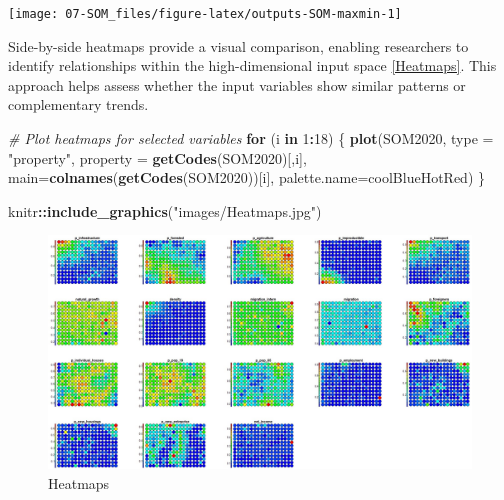 \documentclass[
]{article}
\newenvironment{Shaded}{\begin{snugshade}}{\end{snugshade}}
\newcommand{\AttributeTok}[1]{\textcolor[rgb]{0.13,0.29,0.53}{#1}}
\newcommand{\CommentTok}[1]{\textcolor[rgb]{0.56,0.35,0.01}{\textit{#1}}}
\newcommand{\ControlFlowTok}[1]{\textcolor[rgb]{0.13,0.29,0.53}{\textbf{#1}}}
\newcommand{\DecValTok}[1]{\textcolor[rgb]{0.00,0.00,0.81}{#1}}
\newcommand{\FunctionTok}[1]{\textcolor[rgb]{0.13,0.29,0.53}{\textbf{#1}}}
\newcommand{\NormalTok}[1]{#1}
\newcommand{\SpecialCharTok}[1]{\textcolor[rgb]{0.81,0.36,0.00}{\textbf{#1}}}
\newcommand{\StringTok}[1]{\textcolor[rgb]{0.31,0.60,0.02}{#1}}
\begin{document}
\begin{center}\texttt{[image: 07-SOM\_files/figure-latex/outputs-SOM-maxmin-1]} \end{center}

Side-by-side heatmaps provide a visual comparison, enabling researchers to identify relationships within the high-dimensional input space \autoref{Heatmaps}.
This approach helps assess whether the input variables show similar patterns or complementary trends.

\begin{Shaded}
\begin{Highlighting}[]
\CommentTok{\# Plot heatmaps for selected variables}
\ControlFlowTok{for}\NormalTok{ (i }\ControlFlowTok{in} \DecValTok{1}\SpecialCharTok{:}\DecValTok{18}\NormalTok{) }
\NormalTok{  \{}
\FunctionTok{plot}\NormalTok{(SOM2020, }\AttributeTok{type =} \StringTok{"property"}\NormalTok{, }\AttributeTok{property =} \FunctionTok{getCodes}\NormalTok{(SOM2020)[,i],}
     \AttributeTok{main=}\FunctionTok{colnames}\NormalTok{(}\FunctionTok{getCodes}\NormalTok{(SOM2020))[i], }\AttributeTok{palette.name=}\NormalTok{coolBlueHotRed)}
\NormalTok{  \}}
\end{Highlighting}
\end{Shaded}

\begin{Shaded}
\begin{Highlighting}[]
\NormalTok{knitr}\SpecialCharTok{::}\FunctionTok{include\_graphics}\NormalTok{(}\StringTok{"images/Heatmaps.jpg"}\NormalTok{)}
\end{Highlighting}
\end{Shaded}

\begin{figure}

{\centering \includegraphics[width=0.7\linewidth,height=0.7\textheight]{images/Heatmaps} 

}

\caption{Heatmaps \label{Heatmaps}}\label{fig:jpg1}
\end{figure}
\end{document}
